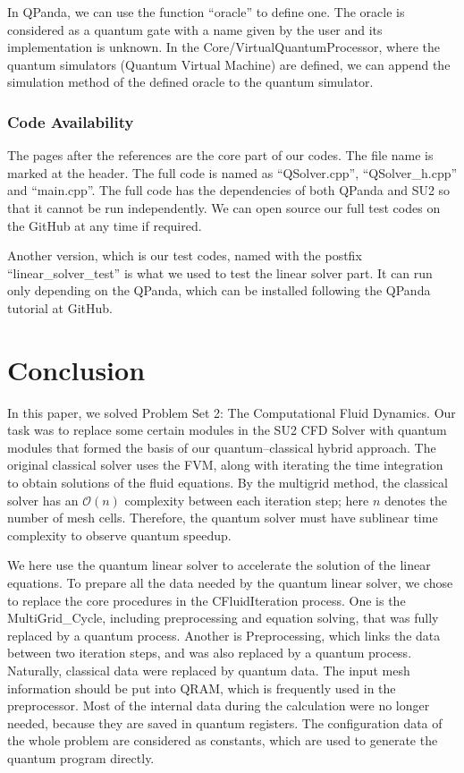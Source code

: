 \documentclass[%
 reprint,
 amsmath,amssymb,
pra,
]{revtex4-1}
\begin{document}
In QPanda, we can use the function ``oracle'' to define one. The oracle is considered as a quantum gate with a name given by the user and its implementation is unknown. In the Core/VirtualQuantumProcessor, where the quantum simulators (Quantum Virtual Machine) are defined, we can append the simulation method of the defined oracle to the quantum simulator.

\subsubsection{Code Availability}
The pages after the references are the core part of our codes. The file name is marked at the header. The full code is named as ``QSolver.cpp'', ``QSolver\_h.cpp'' and ``main.cpp''. The full code has the dependencies of both QPanda and SU2 so that it cannot be run independently. We can open source our full test codes on the GitHub at any time if required.

Another version, which is our test codes, named with the postfix ``linear\_solver\_test'' is what we used to test the linear solver part. It can run only depending on the QPanda, which can be installed following the QPanda tutorial at GitHub.

\section{Conclusion}

In this paper, we solved Problem Set 2: The Computational Fluid Dynamics. Our task was to replace some certain modules in the SU2 CFD Solver with quantum modules that formed the basis of our quantum--classical hybrid approach. The original classical solver uses the FVM, along with iterating the time integration to obtain solutions of the fluid equations. By the multigrid method, the classical solver has an $\mathcal{O}(n)$ complexity between each iteration step; here $n$ denotes the number of mesh cells. Therefore, the quantum solver must have sublinear time complexity to observe quantum speedup.

We here use the quantum linear solver to accelerate the solution of the linear equations. To prepare all the data needed by the quantum linear solver, we chose to replace the core procedures in the CFluidIteration process. One is the MultiGrid\_Cycle, including preprocessing and equation solving, that was fully replaced by a quantum process. Another is Preprocessing, which links the data between two iteration steps, and was also replaced by a quantum process. Naturally, classical data were replaced by quantum data. The input mesh information should be put into QRAM, which is frequently used in the preprocessor. Most of the internal data during the calculation were no longer needed, because they are saved in quantum registers. The configuration data of the whole problem are considered as constants, which are used to generate the quantum program directly.
\end{document}
